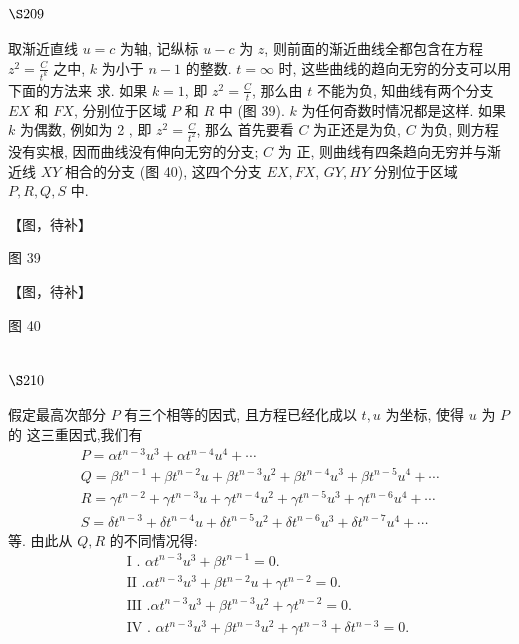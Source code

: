 \section{$\S 209$}

取渐近直线 $u=c$ 为轴, 记纵标 $u-c$ 为 $z$, 则前面的渐近曲线全都包含在方程 $z^{2}=\frac{C}{t^{k}}$ 之中, $k$ 为小于 $n-1$ 的整数. $t=\infty$ 时, 这些曲线的趋向无穷的分支可以用下面的方法来 求. 如果 $k=1$, 即 $z^{2}=\frac{C}{t}$, 那么由 $t$ 不能为负, 知曲线有两个分支 $E X$ 和 $F X$, 分别位于区域 $P$ 和 $R$ 中 (图 39). $k$ 为任何奇数时情况都是这样. 如果 $k$ 为偶数, 例如为 2 , 即 $z^{2}=\frac{C}{t^{2}}$, 那么 首先要看 $C$ 为正还是为负, $C$ 为负, 则方程没有实根, 因而曲线没有伸向无穷的分支; $C$ 为 正, 则曲线有四条趋向无穷并与渐近线 $X Y$ 相合的分支 (图 40), 这四个分支 $E X, F X$, $G Y, H Y$ 分别位于区域 $P, R, Q, S$ 中.


【图，待补】

图 39


【图，待补】

图 40

\section{$\S 210$}

假定最高次部分 $P$ 有三个相等的因式, 且方程已经化成以 $t, u$ 为坐标, 使得 $u$ 为 $P$ 的 这三重因式,我们有
\[
\begin{gathered}
P=\alpha t^{n-3} u^{3}+\alpha t^{n-4} u^{4}+\cdots \\
Q=\beta t^{n-1}+\beta t^{n-2} u+\beta t^{n-3} u^{2}+\beta t^{n-4} u^{3}+\beta t^{n-5} u^{4}+\cdots \\
R=\gamma t^{n-2}+\gamma t^{n-3} u+\gamma t^{n-4} u^{2}+\gamma t^{n-5} u^{3}+\gamma t^{n-6} u^{4}+\cdots \\
S=\delta t^{n-3}+\delta t^{n-4} u+\delta t^{n-5} u^{2}+\delta t^{n-6} u^{3}+\delta t^{n-7} u^{4}+\cdots
\end{gathered}
\]
等. 由此从 $Q, R$ 的不同情况得:
\[
\begin{aligned}
& \text { I . } \alpha t^{n-3} u^{3}+\beta t^{n-1}=0 . \\
& \text { II } . \alpha t^{n-3} u^{3}+\beta t^{n-2} u+\gamma t^{n-2}=0 . \\
& \text { III } . \alpha t^{n-3} u^{3}+\beta t^{n-3} u^{2}+\gamma t^{n-2}=0 . \\
& \text { IV . } \alpha t^{n-3} u^{3}+\beta t^{n-3} u^{2}+\gamma t^{n-3}+\delta t^{n-3}=0 .
\end{aligned}
\]
